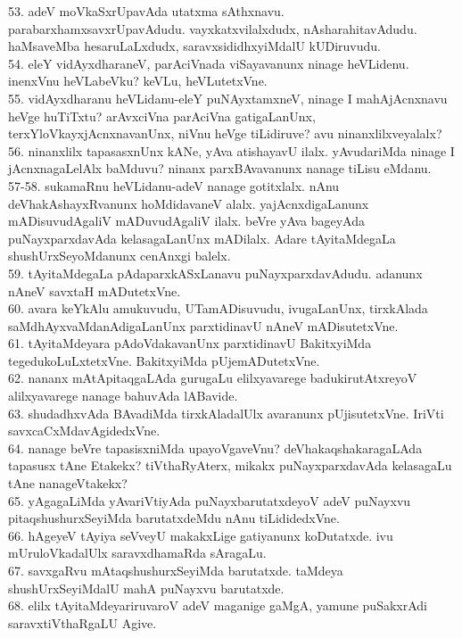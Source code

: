 \documentclass{article}
\begin{document}
53. adeV moVkaSxrUpavAda utatxma sAthxnavu. parabarxhamxsavxrUpavAdudu. vayxkatxvilalxdudx, nAsharahitavAdudu. haMsaveMba hesaruLaLxdudx, saravxsididhxyiMdalU kUDiruvudu.\\
54. eleY vidAyxdharaneV, parAciVnada viSayavanunx ninage heVLidenu. inenxVnu heVLabeVku? keVLu, heVLutetxVne.\\
55. vidAyxdharanu heVLidanu-eleY puNAyxtamxneV, ninage I mahAjAcnxnavu heVge huTiTxtu? arAvxciVna parAciVna gatigaLanUnx, terxYloVkayxjAcnxnavanUnx, niVnu heVge tiLidiruve? avu ninanxlilxveyalalx?\\
56. ninanxlilx tapasasxnUnx kANe, yAva atishayavU ilalx. yAvudariMda ninage I jAcnxnagaLelAlx baMduvu? ninanx parxBAvavanunx nanage tiLisu eMdanu.\\
57-58. sukamaRnu heVLidanu-adeV nanage gotitxlalx. nAnu deVhakAshayxRvanunx hoMdidavaneV alalx. yajAcnxdigaLanunx mADisuvudAgaliV mADuvudAgaliV ilalx. beVre yAva bageyAda puNayxparxdavAda kelasagaLanUnx mADilalx. Adare tAyitaMdegaLa shushUrxSeyoMdanunx cenAnxgi balelx.\\
59. tAyitaMdegaLa pAdaparxkASxLanavu puNayxparxdavAdudu. adanunx nAneV savxtaH mADutetxVne.\\
60. avara keYkAlu amukuvudu, UTamADisuvudu, ivugaLanUnx, tirxkAlada saMdhAyxvaMdanAdigaLanUnx parxtidinavU nAneV mADisutetxVne.\\
61. tAyitaMdeyara pAdoVdakavanUnx parxtidinavU BakitxyiMda tegedukoLuLxtetxVne. BakitxyiMda pUjemADutetxVne.\\
62. nananx mAtApitaqgaLAda gurugaLu elilxyavarege badukirutAtxreyoV alilxyavarege nanage bahuvAda lABavide.\\
63. shudadhxvAda BAvadiMda tirxkAladalUlx avaranunx pUjisutetxVne. IriVti savxcaCxMdavAgidedxVne.\\
64. nanage beVre tapasisxniMda upayoVgaveVnu? deVhakaqshakaragaLAda tapasusx tAne Etakekx? tiVthaRyAterx, mikakx puNayxparxdavAda kelasagaLu tAne nanageVtakekx?\\
65. yAgagaLiMda yAvariVtiyAda puNayxbarutatxdeyoV adeV puNayxvu pitaqshushurxSeyiMda barutatxdeMdu nAnu tiLididedxVne.\\
66. hAgeyeV tAyiya seVveyU makakxLige gatiyanunx koDutatxde. ivu mUruloVkadalUlx saravxdhamaRda sAragaLu.\\
67. savxgaRvu mAtaqshushurxSeyiMda barutatxde. taMdeya shushUrxSeyiMdalU mahA puNayxvu barutatxde.\\
68. elilx tAyitaMdeyariruvaroV adeV maganige gaMgA, yamune puSakxrAdi saravxtiVthaRgaLU Agive.\\
\end{document}
